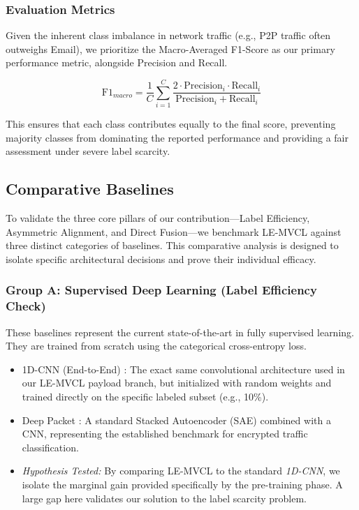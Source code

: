 \subsubsection{Evaluation Metrics}
Given the inherent class imbalance in network traffic (e.g., P2P traffic often outweighs Email), we prioritize the Macro-Averaged F1-Score as our primary performance metric, alongside Precision and Recall.

\begin{equation}
    \text{F1}_{macro} = \frac{1}{C} \sum_{i=1}^{C} \frac{2 \cdot \text{Precision}_i \cdot \text{Recall}_i}{\text{Precision}_i + \text{Recall}_i}
\end{equation}

This ensures that each class contributes equally to the final score, preventing majority classes from dominating the reported performance and providing a fair assessment under severe label scarcity.

\subsection{Comparative Baselines}
\label{subsec:baselines}

To validate the three core pillars of our contribution—Label Efficiency, Asymmetric Alignment, and Direct Fusion—we benchmark LE-MVCL against three distinct categories of baselines. This comparative analysis is designed to isolate specific architectural decisions and prove their individual efficacy.

\subsubsection{Group A: Supervised Deep Learning (Label Efficiency Check)}
These baselines represent the current state-of-the-art in fully supervised learning. They are trained from scratch using the categorical cross-entropy loss.
\begin{itemize}
    \item 1D-CNN (End-to-End) \cite{wang2017end}: 
    The exact same convolutional architecture used in our LE-MVCL payload branch, but initialized with random weights and trained directly on the specific labeled subset (e.g., 10\%).
    \item Deep Packet \cite{lotfollahi2020deep}: 
    A standard Stacked Autoencoder (SAE) combined with a CNN, representing the established benchmark for encrypted traffic classification.
    \item \textit{Hypothesis Tested:} By comparing LE-MVCL to the standard \textit{1D-CNN}, we isolate the marginal gain provided specifically by the pre-training phase. A large gap here validates our solution to the label scarcity problem.
\end{itemize}

